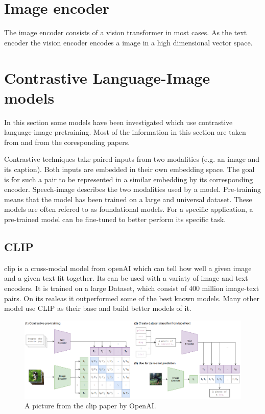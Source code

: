     \section{Image encoder}
    The image encoder consists of a vision transformer\cite{Vis_N_Grams} in most cases.
    As the text encoder the vision encoder encodes a image in a high dimensional vector space.


    
    \section{Contrastive Language-Image models
        \label{section:languageimagemodels}}
        In this section some models have been investigated which use contrastive language-image pretraining.
        Most of the information in this section are taken from \cite{cliplikeweb} and from the coresponding papers.

        Contrastive techniques take paired inputs from two modalities (e.g. an image and its caption).
        Both inputs are embedded in their own embedding space.
        The goal is for such a pair to be represented in a similar embedding by its corresponding encoder.
        Speech-image describes the two modalities used by a model.
        Pre-training means that the model has been trained on a large and universal dataset.
        These models are often refered to as foundational models.
        For a specific application, a pre-trained model can be fine-tuned to better perform its specific task.

        \subsection{CLIP
            \label{section:clip}}
        \acrfull{clip} \cite{clip} is a cross-modal model from openAI\cite{openai} which can tell how well a given image and a given text fit together.
        Its can be used with a variaty of image and text encoders.
        It is trained on a large Dataset, which consist of 400 million image-text pairs.
        On its realeas it outperformed some of the best known models.
        Many other model use CLIP as their base and build better models of it.

        \begin{figure}
            \centering
            \includegraphics[width=\textwidth]{Images/crossmodalnetworks/OpenAICLIP.png}
            \caption{A picture from the \acrshort{clip} paper by OpenAI.}
            \label{fig:crossmodalnetworks:openaiclip}
        \end{figure}

